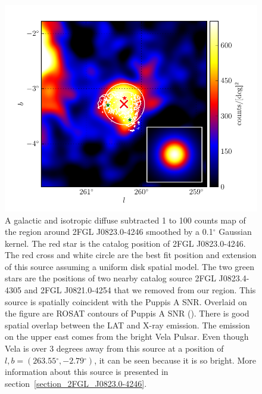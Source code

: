 \documentclass[12pt,preprint]{aastex}
\newcommand{\gev}{\text{GeV}\xspace}
\renewcommand{\deg}{\ensuremath{^\circ}\xspace}
\begin{document}
\begin{figure}
  \begin{center}
    \includegraphics[type=pdf,ext=.pdf,read=.pdf]{source_plots/source_1FGL_J0823.3-4248}
  \end{center}
  \caption{A galactic and isotropic diffuse subtracted 1 \gev to 100
  \gev counts map of the region around 2FGL J0823.0-4246 smoothed by
  a 0.1\deg Gaussian kernel.  The red star is the catalog position
  of 2FGL J0823.0-4246.  The red cross and white circle are the best
  fit position and extension of this source assuming a uniform disk
  spatial model.  The two green stars are the positions of two nearby
  catalog source 2FGL J0823.4-4305 and 2FGL J0821.0-4254 that we removed
  from our region. This source is spatially coincident with the Puppis
  A SNR. Overlaid on the figure are ROSAT contours of Puppis A SNR
  (\cite{rosat_puppis_a}). There is good spatial overlap between the
  LAT and X-ray emission.  The emission on the upper east comes from the
  bright Vela Pulsar. Even though Vela is over 3 degrees away from
  this source at a position of $l,b=(263.55\deg,-2.79\deg)$, it can be
  seen because it is so bright. More information about this source is
  presented in section~\ref{section_2FGL_J0823.0-4246}.
  }\label{1FGL_J0823.3-4248}
\end{figure}
\end{document}

